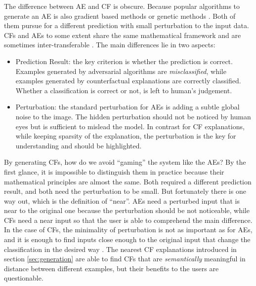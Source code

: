 The difference between AE and CF is obscure. Because popular algorithms to generate an AE is also gradient based methods or genetic methods \cite{AEoverview}. Both of them pursue for a different prediction with small perturbation to the input data. CFs and AEs to some extent share the same mathematical framework and are sometimes inter-transferable \cite{CFandAE}. The main differences lie in two aspects:
\begin{itemize}
  \item Prediction Result: the key criterion is whether the prediction is correct. Examples generated by adversarial algorithms are \emph{misclassified}, while examples generated by counterfactual explanations are correctly classified. Whether a classification is correct or not, is left to human's judgement.
  \item Perturbation: the standard perturbation for AEs is adding a subtle global noise to the image. The hidden perturbation should not be noticed by human eyes but is sufficient to mislead the model. In contrast for CF explanations, while keeping sparsity of the explanation, the perturbation is the key for understanding and should be highlighted.
\end{itemize}
By generating CFs, how do we avoid  ``gaming'' the system like the AEs? By the first glance, it is impossible to distinguish them in practice because their mathematical principles are almost the same. Both required a different prediction result, and both need the perturbation to be small. But fortunately there is one way out, which is the definition of ``near''. AEs need a perturbed input that is near to the original one because the perturbation should be not noticeable, while CFs need a near input so that the user is able to comprehend the main difference. In the case of CFs, the minimality of perturbation is not as important as for AEs, and it is enough to find inputs close enough to the original input that change the classification in the desired way \cite{CFandAE}. The nearest CF explanations introduced in section \ref{sec:generation} are able to find CFs that are \emph{semantically} meaningful in distance between different examples, but their benefits to the users are questionable.

